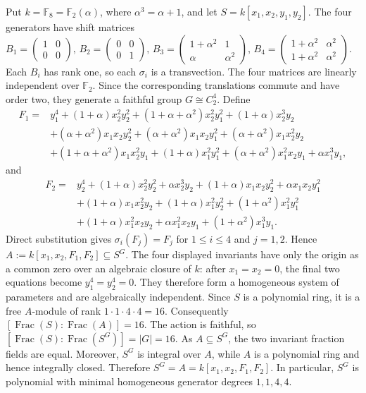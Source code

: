 \documentclass[11pt]{article}
\theoremstyle{definition}
\begin{document}
Put $k=\mathbb F_8=\mathbb F_2(\alpha)$, where
$\alpha^3=\alpha+1$, and let
$S=k[x_1,x_2,y_1,y_2]$.  The four generators have shift matrices $B_1=\begin{pmatrix}1&0\\0&0\end{pmatrix},\,
B_2=\begin{pmatrix}0&0\\0&1\end{pmatrix}, \, B_3=\begin{pmatrix}1+\alpha^2&1\\ \alpha&\alpha^2\end{pmatrix},
\, B_4=\begin{pmatrix}1+\alpha^2&\alpha^2\\
	1+\alpha^2&\alpha^2\end{pmatrix}$. Each $B_i$ has rank one, so each $\sigma_i$ is a transvection.  The four matrices are linearly independent over $\mathbb F_2$.  Since the corresponding translations commute and have order two, they generate a faithful group $G\cong C_2^4$. Define
\[
\begin{aligned}
	F_1={}&y_1^4+(1+\alpha)x_2^2y_2^2
	+(1+\alpha+\alpha^2)x_2^2y_1^2+(1+\alpha)x_2^3y_2\\
	&+(\alpha+\alpha^2)x_1x_2y_2^2
	+(\alpha+\alpha^2)x_1x_2y_1^2
	+(\alpha+\alpha^2)x_1x_2^2y_2\\
	&+(1+\alpha+\alpha^2)x_1x_2^2y_1
	+(1+\alpha)x_1^2y_1^2
	+(\alpha+\alpha^2)x_1^2x_2y_1+\alpha x_1^3y_1,
\end{aligned}
\]
and
\[
\begin{aligned}
	F_2={}&y_2^4+(1+\alpha)x_2^2y_2^2+\alpha x_2^3y_2
	+(1+\alpha)x_1x_2y_2^2+\alpha x_1x_2y_1^2\\
	&+(1+\alpha)x_1x_2^2y_2+(1+\alpha)x_1^2y_2^2
	+(1+\alpha^2)x_1^2y_1^2\\
	&+(1+\alpha)x_1^2x_2y_2+\alpha x_1^2x_2y_1
	+(1+\alpha^2)x_1^3y_1.
\end{aligned}
\]
Direct substitution gives $\sigma_i(F_j)=F_j$ for
$1\leq i\leq4$ and $j=1,2$.  Hence $A:=k[x_1,x_2,F_1,F_2]\subseteq S^G$. The four displayed invariants have only the origin as a common zero over an algebraic closure of $k$: after $x_1=x_2=0$, the final two equations become $y_1^4=y_2^4=0$.  They therefore form a homogeneous system of parameters and are algebraically independent.  Since $S$ is a polynomial ring, it is a free $A$-module of rank
$1\cdot1\cdot4\cdot4=16$. Consequently $[\operatorname{Frac}(S):\operatorname{Frac}(A)]=16$.
The action is faithful, so $[\operatorname{Frac}(S):\operatorname{Frac}(S^G)]=|G|=16$. As $A\subseteq S^G$, the two invariant fraction fields are equal. Moreover, $S^G$ is integral over $A$, while $A$ is a polynomial ring
and hence integrally closed.  Therefore $S^G=A=k[x_1,x_2,F_1,F_2]$.
In particular, $S^G$ is polynomial with minimal homogeneous generator
degrees $1,1,4,4$.
\end{document}
